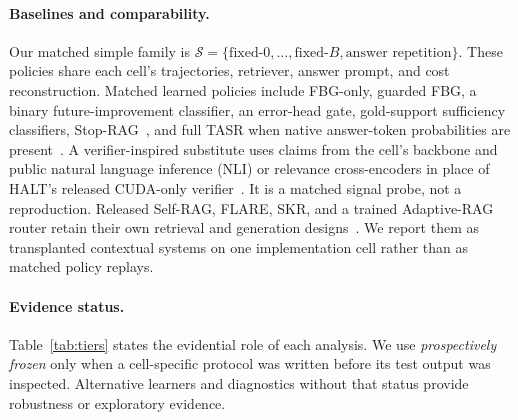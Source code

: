 \paragraph{Baselines and comparability.}
Our matched simple family is
$\mathcal{S}=\{\text{fixed-}0,\ldots,\text{fixed-}B,
\text{answer repetition}\}$. These policies share each cell's trajectories,
retriever, answer prompt, and cost reconstruction. Matched learned policies
include FBG-only, guarded FBG, a binary future-improvement classifier, an
error-head gate,
gold-support sufficiency classifiers, Stop-RAG~\cite{park2025stoprag}, and
full TASR when native answer-token probabilities are present~\cite{kieback2026tasr}.
A verifier-inspired substitute uses claims from the cell's backbone and public
natural language inference (NLI) or relevance cross-encoders in place of
HALT's released CUDA-only
verifier~\cite{roh2026halt}. It is a matched signal probe, not a reproduction.
Released Self-RAG, FLARE, SKR, and a trained Adaptive-RAG router retain their
own retrieval and generation designs~\cite{asai2024selfrag,jiang2023flare,
wang2023skr,jeong2024adaptiverag}. We report them as transplanted contextual
systems on one implementation cell rather than as matched policy replays.

\paragraph{Evidence status.}
Table~\ref{tab:tiers} states the evidential role of each analysis. We use
\emph{prospectively frozen} only when a cell-specific protocol was written
before its test output was inspected. Alternative learners and diagnostics
without that status provide robustness or exploratory evidence.

